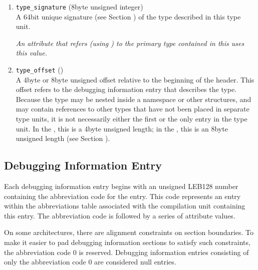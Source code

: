 \begin{enumerate}[1. ]
\item \texttt{type\_signature} (8\dash byte unsigned integer) \\
A 
64\dash bit unique signature (see Section 
)
of the type described in this type
unit.  

\textit{An attribute that refers (using 
) to
the primary type contained in this 
 uses this value.}


\item \texttt{type\_offset} () \\
A 4\dash byte or 8\dash byte unsigned offset 
relative to the beginning
of the  header.
This offset refers to the debugging
information entry that describes the type. Because the type
may be nested inside a namespace or other structures, and may
contain references to other types that have not been placed in
separate type units, it is not necessarily either the first or
the only entry in the type unit. In the \thirtytwobitdwarfformat,
this is a 4\dash byte unsigned length; in the \sixtyfourbitdwarfformat,
this is an 8\dash byte unsigned length
(see Section ).

\end{enumerate}

\subsection{Debugging Information Entry}
\label{datarep:debugginginformationentry}

Each debugging information entry begins with an unsigned LEB128
number containing the abbreviation code for the entry. This
code represents an entry within the abbreviations table
associated with the compilation unit containing this entry. The
abbreviation code is followed by a series of attribute values.

On some architectures, there are alignment constraints on
section boundaries. To make it easier to pad debugging
information sections to satisfy such constraints, the
abbreviation code 0 is reserved. Debugging information entries
consisting of only the abbreviation code 0 are considered
null entries.

